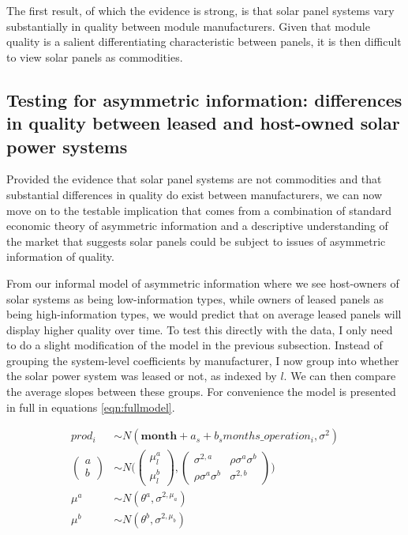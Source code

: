 \documentclass[a4paper]{article}
\begin{document}
The first result, of which the evidence is strong, is that solar panel systems vary substantially in quality between module manufacturers. Given that module quality is a salient differentiating characteristic between panels, it is then difficult to view solar panels as commodities.

\subsection{Testing for asymmetric information: differences in quality between leased and host-owned solar power systems}

Provided the evidence that solar panel systems are not commodities and that substantial differences in quality do exist between manufacturers, we can now move on to the testable implication that comes from a combination of standard economic theory of asymmetric information and a descriptive understanding of the market that suggests solar panels could be subject to issues of asymmetric information of quality.

From our informal model of asymmetric information where we see host-owners of solar systems as being low-information types, while owners of leased panels as being high-information types, we would predict that on average leased panels will display higher quality over time. To test this directly with the data, I only need to do a slight modification of the model in the previous subsection. Instead of grouping the system-level coefficients by manufacturer, I now group into whether the solar power system was leased or not, as indexed by $l$. We can then compare the average slopes between these groups. For convenience the model is presented in full in equations \ref{eqn:fullmodel}.

\begin{equation}
\begin{aligned}
prod_{i} &\sim N(\mathbf{month} + a_s + b_s months\_operation_{i}, \sigma^2)\\
\begin{pmatrix}
  a\\
  b
\end{pmatrix}
&\sim N \Bigg(
\begin{pmatrix}
  \mu^a_l\\
  \mu^b_l
\end{pmatrix},
\begin{pmatrix}
  \sigma^{2,a} & \rho \sigma^{a} \sigma^{b} \\
  \rho \sigma^a \sigma^b & \sigma^{2,b}
\end{pmatrix} \Bigg) \\
\mu^{a} &\sim N(\theta^a, \sigma^{2,\mu_a}) \\
\mu^{b} & \sim N(\theta^b, \sigma^{2,\mu_b}) \label{eqn:fullmodel}
\end{aligned}
\end{equation}
\end{document}
